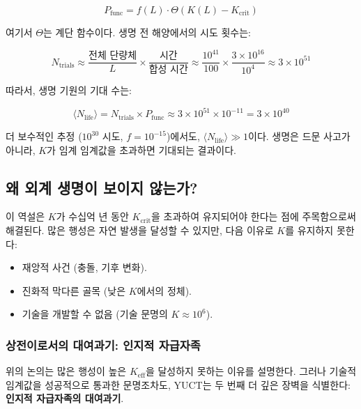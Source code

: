 \documentclass[12pt,a4paper]{article}
\newcommand{\Keffcrit}{K_{\mathrm{crit}}}
\newcommand{\Ntrials}{N_{\mathrm{trials}}}
\newcommand{\Nlife}{\langle N_{\mathrm{life}}\rangle}
\theoremstyle{remark}
\begin{document}
	\begin{equation}
		P_{\text{func}} = f(L) \cdot \Theta(K(L) - K_{\text{crit}})
		\label{eq:Pfunc}
	\end{equation}
	
	여기서 \(\Theta\)는 계단 함수이다. 생명 전 해양에서의 시도 횟수는:
	
	\begin{equation}
		\Ntrials \approx \frac{\text{전체 단량체}}{L} \times \frac{\text{시간}}{\text{합성 시간}} \approx \frac{10^{41}}{100} \times \frac{3\times 10^{16}}{10^4} \approx 3 \times 10^{51}
		\label{eq:trials}
	\end{equation}
	
	따라서, 생명 기원의 기대 수는:
	
	\begin{equation}
		\Nlife = \Ntrials \times P_{\text{func}} \approx 3 \times 10^{51} \times 10^{-11} = 3 \times 10^{40}
		\label{eq:Nlife}
	\end{equation}
	
	더 보수적인 추정 (\(10^{30}\) 시도, \(f=10^{-15}\))에서도, \(\Nlife \gg 1\)이다. 생명은 드문 사고가 아니라, \(K\)가 임계 임계값을 초과하면 기대되는 결과이다.
	
	\subsection{왜 외계 생명이 보이지 않는가?}
	
	이 역설은 \(K\)가 수십억 년 동안 \(\Keffcrit\)을 초과하여 유지되어야 한다는 점에 주목함으로써 해결된다. 많은 행성은 자연 발생을 달성할 수 있지만, 다음 이유로 \(K\)를 유지하지 못한다:
	
	\begin{itemize}
		\item 재앙적 사건 (충돌, 기후 변화).
		\item 진화적 막다른 골목 (낮은 \(K\)에서의 정체).
		\item 기술을 개발할 수 없음 (기술 문명의 \(K \approx 10^6\)).
	\end{itemize}
	
	\subsubsection*{상전이로서의 대여과기: 인지적 자급자족}
	
	위의 논의는 많은 행성이 높은 \(K_{\mathrm{eff}}\)을 달성하지 못하는 이유를 설명한다. 그러나 기술적 임계값을 성공적으로 통과한 문명조차도, YUCT는 두 번째 더 깊은 장벽을 식별한다: \textbf{인지적 자급자족의 대여과기}.
	
\end{document}
